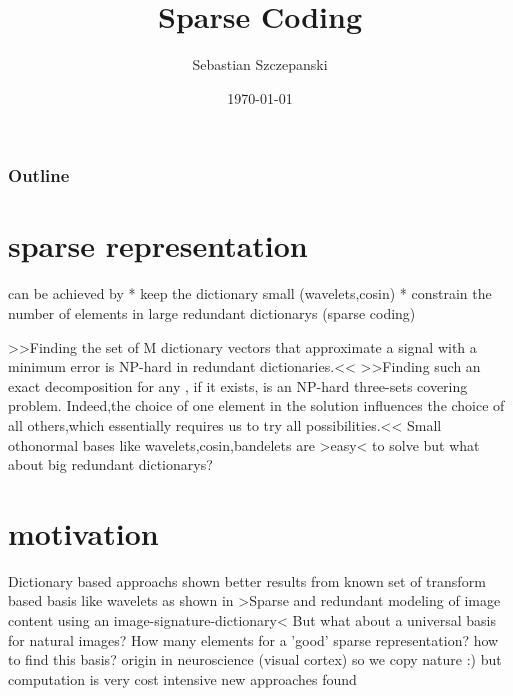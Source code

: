 




\title{Sparse Coding}
\author{Sebastian Szczepanski}
\date{\today}

\begin{frame}
\titlepage
\end{frame}

\begin{frame}
\frametitle{Outline}
\tableofcontents[part=1,pausesections]
\end{frame}


\section{sparse representation}
\begin{frame}
can be achieved by
* keep the dictionary small (wavelets,cosin)
* constrain the number of elements in large redundant dictionarys (sparse coding)
\end{frame}

\begin{frame}
>>Finding the set of M dictionary vectors that approximate a signal with a minimum
error is NP-hard in redundant dictionaries.<<
>>Finding such an exact decomposition for any , if it exists, is an NP-hard three-sets
covering problem. Indeed,the choice of one element in the solution influences the
choice of all others,which essentially requires us to try all possibilities.<<
Small othonormal bases like wavelets,cosin,bandelets are >easy< to solve but what about big redundant dictionarys?
\end{frame}

\section{motivation}
\begin{frame}
Dictionary based approachs shown better results from known set of transform based basis like wavelets
as shown in >Sparse and redundant modeling of image content using an image-signature-dictionary<
But what about a universal basis for natural images? 
How many elements for a 'good' sparse representation?
how to find this basis?
origin in neuroscience (visual cortex) so we copy nature :)
but computation is very cost intensive
new approaches found 
\end{frame}

